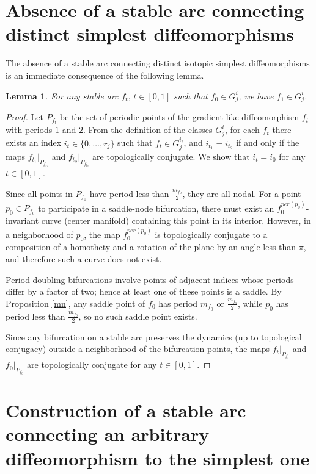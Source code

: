 \documentclass{amsart}
\newtheorem{lemma}{Lemma}
\numberwithin{equation}{section}
\begin{document}
	\section{Absence of a stable arc connecting distinct simplest diffeomorphisms}	
	
	The absence of a stable arc connecting distinct isotopic simplest diffeomorphisms is an immediate consequence of the following lemma.  
	\begin{lemma}\label{step1} For any stable arc $f_t,\,t\in[0,1]$ such that $f_0\in G_j^i$, we have $f_1\in G_j^i$.
	\end{lemma}
	\begin{proof} Let $P_{f_t}$ be the set of periodic points of the gradient-like diffeomorphism $f_t$ with periods $1$ and $2$. From the definition of the classes $G_j^i$, for each $f_t$ there exists an index $i_t\in\{0,\dots,r_j\}$ such that $f_t\in G_j^{i_t}$, and $i_{t_1}=i_{t_2}$ if and only if the maps $f_{t_1}|_{P_{f_{t_1}}}$ and $f_{t_2}|_{P_{f_{t_2}}}$ are topologically conjugate. We show that $i_t=i_0$ for any $t\in[0,1]$.
		
		Since all points in $P_{f_{0}}$ have period less than $\frac{m_{f_0}}{2}$, they are all nodal. For a point $p_0\in P_{f_{0}}$ to participate in a saddle-node bifurcation, there must exist an $f^{per(p_0)}_0$-invariant curve (center manifold) containing this point in its interior. However, in a neighborhood of $p_0$, the map $f^{per(p_0)}_0$ is topologically conjugate to a composition of a homothety and a rotation of the plane by an angle less than $\pi$, and therefore such a curve does not exist.
		
		Period-doubling bifurcations involve points of adjacent indices whose periods differ by a factor of two; hence at least one of these points is a saddle. By Proposition \ref{mn}, any saddle point of $f_0$ has period $m_{f_0}$ or $\frac{m_{f_0}}{2}$, while $p_0$ has period less than $\frac{m_{f_0}}{2}$, so no such saddle point exists.
		
		Since any bifurcation on a stable arc preserves the dynamics (up to topological conjugacy) outside a neighborhood of the bifurcation points, the maps $f_{t}|_{P_{f_{t}}}$ and $f_{0}|_{P_{f_{0}}}$ are topologically conjugate for any $t\in[0,1]$.
	\end{proof}
	
	\section{Construction of a stable arc connecting an arbitrary diffeomorphism to the simplest one}
	
\end{document}
